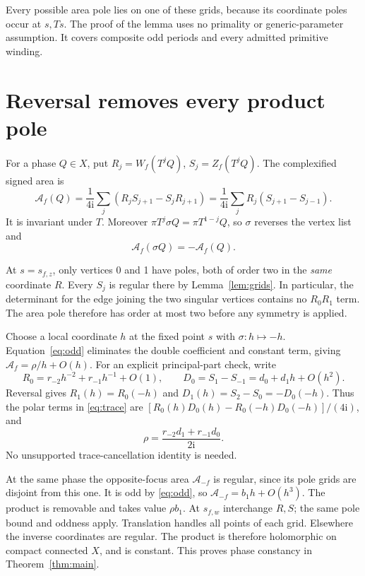 \documentclass[11pt]{article}
\newcommand{\A}{\mathcal A}
\newcommand{\ii}{\mathrm i}
\begin{document}
Every possible area pole lies on one of these grids, because its
coordinate poles occur at \(s,Ts\). The proof of the lemma uses no
primality or generic-parameter assumption. It covers composite odd
periods and every admitted primitive winding.

\section{Reversal removes every product pole}

For a phase \(Q\in X\), put \(R_j=W_f(T^jQ)\), \(S_j=Z_f(T^jQ)\).
The complexified signed area is
\begin{equation}\label{eq:trace}
 \A_f(Q)=\frac1{4\ii}\sum_j(R_jS_{j+1}-S_jR_{j+1})
       =\frac1{4\ii}\sum_jR_j(S_{j+1}-S_{j-1}).
\end{equation}
It is invariant under \(T\). Moreover
\(\pi T^j\sigma Q=\pi T^{1-j}Q\), so \(\sigma\) reverses the vertex
list and
\begin{equation}\label{eq:odd}
 \A_f(\sigma Q)=-\A_f(Q).
\end{equation}

At \(s=s_{f,z}\), only vertices 0 and 1 have poles, both of order two
in the \emph{same} coordinate \(R\). Every \(S_j\) is regular there by
Lemma~\ref{lem:grids}. In particular, the determinant for the edge joining
the two singular vertices contains no \(R_0R_1\) term. The area pole
therefore has order at most two before any symmetry is applied.

Choose a local coordinate \(h\) at the fixed point \(s\) with
\(\sigma:h\mapsto-h\). Equation~\eqref{eq:odd} eliminates the double
coefficient and constant term, giving \(\A_f=\rho/h+O(h)\).
For an explicit principal-part check, write
\[
 R_0=r_{-2}h^{-2}+r_{-1}h^{-1}+O(1),\qquad
 D_0=S_1-S_{-1}=d_0+d_1h+O(h^2).
\]
Reversal gives \(R_1(h)=R_0(-h)\) and
\(D_1(h)=S_2-S_0=-D_0(-h)\). Thus the polar terms in \eqref{eq:trace}
are \([R_0(h)D_0(h)-R_0(-h)D_0(-h)]/(4\ii)\), and
\begin{equation}\label{eq:residue}
 \rho=\frac{r_{-2}d_1+r_{-1}d_0}{2\ii}.
\end{equation}
No unsupported trace-cancellation identity is needed.

At the same phase the opposite-focus area \(\A_{-f}\) is regular,
since its pole grids are disjoint from this one. It is odd by
\eqref{eq:odd}, so \(\A_{-f}=b_1h+O(h^3)\). The product is removable
and takes value \(\rho b_1\). At \(s_{f,w}\) interchange \(R,S\);
the same pole bound and oddness apply. Translation handles all points
of each grid. Elsewhere the inverse coordinates are regular. The
product is therefore holomorphic on compact connected \(X\), and is
constant. This proves phase constancy in Theorem~\ref{thm:main}.
\end{document}
